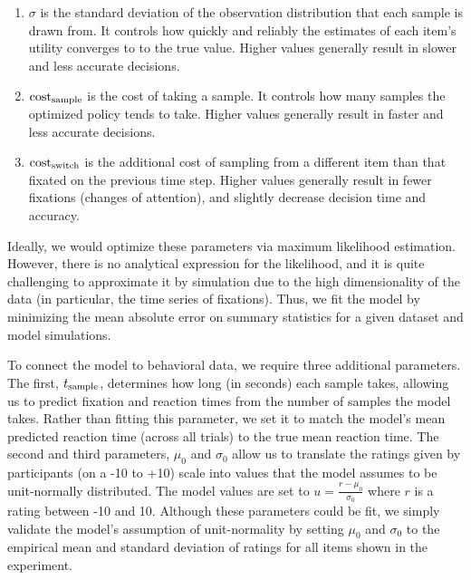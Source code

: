 \documentclass[12pt,a4paperpaper,]{article}
\begin{document}
\begin{enumerate}
  \item $\sigma$ is the standard deviation of the observation distribution that each sample is drawn from. It controls how quickly and reliably the estimates of each item's utility converges to to the true value. Higher values generally result in slower and less accurate decisions.
  \item $\text{cost}_\text{sample}$ is the cost of taking a sample. It controls how many samples the optimized policy tends to take. Higher values generally result in faster and less accurate decisions.
  \item $\text{cost}_\text{switch}$ is the additional cost of sampling from a different item than that fixated on the previous time step. Higher values generally result in fewer fixations (changes of attention), and slightly decrease decision time and accuracy.
\end{enumerate}

Ideally, we would optimize these parameters via maximum likelihood estimation. However, there is no analytical expression for the likelihood, and it is quite challenging to approximate it by simulation due to the high dimensionality of the data (in particular, the time series of fixations). Thus, we fit the model by minimizing the mean absolute error on summary statistics for a given dataset and model simulations.

To connect the model to behavioral data, we require three additional parameters. The first, $t_\text{sample}$, determines how long (in seconds) each sample takes, allowing us to predict fixation and reaction times from the number of samples the model takes. Rather than fitting this parameter, we set it to match the model's mean predicted reaction time (across all trials) to the true mean reaction time. The second and third parameters, $\mu_0$ and $\sigma_0$ allow us to translate the ratings given by participants (on a -10 to +10) scale into values that the model assumes to be unit-normally distributed. The model values are set to $u = \frac{r - \mu_0}{\sigma_0}$ where $r$ is a rating between -10 and 10. Although these parameters could be fit, we simply validate the model's assumption of unit-normality by setting $\mu_0$ and $\sigma_0$ to the empirical mean and standard deviation of ratings for all items shown in the experiment.

\end{document}
